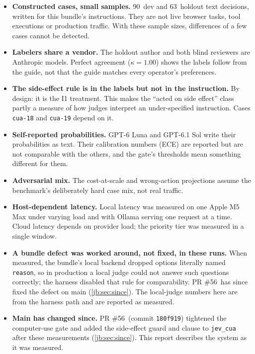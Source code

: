 \documentclass[11pt,letterpaper]{article}
\newcommand{\code}[1]{\texttt{#1}}
\newcommand{\DevN}{90}
\newcommand{\HoldN}{63}
\newcommand{\KappaHoldAB}{1.00}
\newcommand{\SinceCommit}{180f919}
\newcommand{\SincePR}{56}
\begin{document}
\begin{itemize}
  \item \textbf{Constructed cases, small samples.} \DevN\ dev and \HoldN\ holdout text decisions, written
    for this bundle's instructions. They are not live browser tasks, tool executions or production
    traffic. With these sample sizes, differences of a few cases cannot be detected.
  \item \textbf{Labelers share a vendor.} The holdout author and both blind reviewers are Anthropic
    models. Perfect agreement ($\kappa = \KappaHoldAB$) shows the labels follow from the guide, not that
    the guide matches every operator's preferences.
  \item \textbf{The side-effect rule is in the labels but not in the instruction.} By design: it is the
    I1 treatment. This makes the ``acted on side effect'' class partly a measure of how judges interpret
    an under-specified instruction. Cases \code{cua-18} and \code{cua-19} depend on it.
  \item \textbf{Self-reported probabilities.} GPT-6 Luna and GPT-6.1 Sol write their probabilities as
    text. Their calibration numbers (ECE) are reported but are not comparable with the others, and the
    gate's thresholds mean something different for them.
  \item \textbf{Adversarial mix.} The cost-at-scale and wrong-action projections assume the benchmark's
    deliberately hard case mix, not real traffic.
  \item \textbf{Host-dependent latency.} Local latency was measured on one Apple M5 Max under varying load
    and with Ollama serving one request at a time. Cloud latency depends on provider load; the priority
    tier was measured in a single window.
  \item \textbf{A bundle defect was worked around, not fixed, in these runs.} When measured, the
    bundle's local backend dropped options literally named \code{reason}, so in production a local judge
    could not answer such questions correctly; the harness disabled that rule for comparability. PR
    \#\SincePR\ has since fixed the defect on main (\cref{jb:sec:since}). The local-judge numbers here are
    from the harness path and are reported as measured.
  \item \textbf{Main has changed since.} PR \#\SincePR\ (commit \code{\SinceCommit}) tightened the
    computer-use gate and added the side-effect guard and clause to \code{jev\_cua} after these
    measurements (\cref{jb:sec:since}). This report describes the system as it was measured.

\end{itemize}
\end{document}
